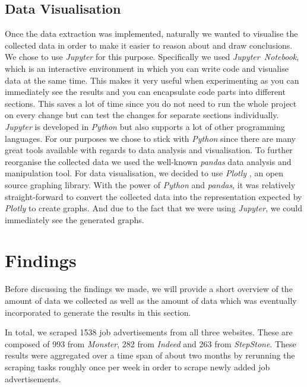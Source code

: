 \documentclass[runningheads]{llncs}
\begin{document}
\subsection{Data Visualisation}
\label{sub:data_visualisation}

Once the data extraction was implemented, naturally we wanted to visualise the collected data in order to make it easier to reason about and draw conclusions. We chose to use \textit{Jupyter} \cite{jupyter} for this purpose. Specifically we used \textit{Jupyter~Notebook}, which is an interactive environment in which you can write code and visualise data at the same time. This makes it very useful when experimenting as you can immediately see the results and you can encapsulate code parts into different sections. This saves a lot of time since you do not need to run the whole project on every change but can test the changes for separate sections individually. \textit{Jupyter} is developed in \textit{Python} \cite{python} but also supports a lot of other programming languages. For our purposes we chose to stick with \textit{Python} since there are many great tools available with regards to data analysis and visualisation. To further reorganise the collected data we used the well-known \textit{pandas} \cite{pandas} data analysis and manipulation tool. For data visualisation, we decided to use \textit{Plotly} \cite{plotly}, an open source graphing library. With the power of \textit{Python} and \textit{pandas}, it was relatively straight-forward to convert the collected data into the representation expected by \textit{Plotly} to create graphs. And due to the fact that we were using \textit{Jupyter}, we could immediately see the generated graphs.

\section{Findings}
\label{sec:findings}

Before discussing the findings we made, we will provide a short overview of the amount of data we collected as well as the amount of data which was eventually incorporated to generate the results in this section.


In total, we scraped 1538 job advertisements from all three websites. These are composed of 993 from \textit{Monster}, 282 from \textit{Indeed} and 263 from \textit{StepStone}. These results were aggregated over a time span of about two months by rerunning the scraping tasks roughly once per week in order to scrape newly added job advertisements.
\end{document}
